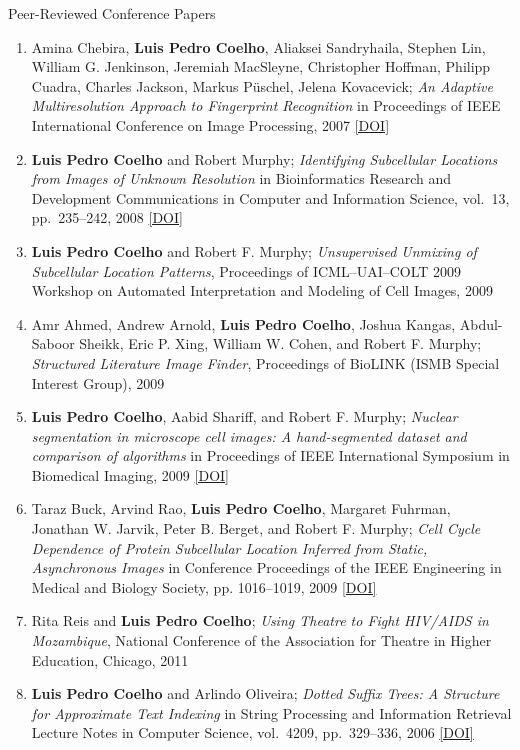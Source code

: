 \documentclass{article}
\renewcommand\subsection[1]{%
    \par\vspace{.1em}\penalty-100%
    {\hspace{1em}\subsubhead #1}%
    \par\vspace{.2em}\penalty100%
}
\newcommand\showdoi[1]{%
    \href{http://dx.doi.org/#1}{[DOI]}%
}
\begin{document}
\subsection{Peer-Reviewed Conference Papers}
\begin{enumerate}
\item Amina Chebira, \textbf{Luis Pedro Coelho}, Aliaksei Sandryhaila, Stephen
Lin, William G. Jenkinson, Jeremiah MacSleyne, Christopher Hoffman, Philipp
Cuadra, Charles Jackson, Markus Püschel, Jelena Kovacevick; \emph{An Adaptive
Multiresolution Approach to Fingerprint Recognition} in Proceedings of IEEE
International Conference on Image Processing, 2007
\showdoi{10.1109/ICIP.2007.4378990}

\item \textbf{Luis Pedro Coelho} and Robert Murphy; \emph{Identifying
Subcellular Locations from Images of Unknown Resolution} in Bioinformatics
Research and Development Communications in Computer and Information Science,
vol.\ 13, pp.\ 235--242, 2008 \showdoi{10.1007/978-3-540-70600-7_18}

\item \textbf{Luis Pedro Coelho} and Robert F. Murphy; \emph{Unsupervised
Unmixing of Subcellular Location Patterns}, Proceedings of ICML--UAI--COLT 2009
Workshop on Automated Interpretation and Modeling of Cell Images, 2009

\item Amr Ahmed, Andrew Arnold, \textbf{Luis Pedro Coelho}, Joshua Kangas,
Abdul-Saboor Sheikk, Eric P. Xing, William W. Cohen, and Robert F. Murphy;
\emph{Structured Literature Image Finder}, Proceedings of BioLINK (ISMB Special
Interest Group), 2009

\item \textbf{Luis Pedro Coelho}, Aabid Shariff, and Robert F. Murphy;
\emph{Nuclear segmentation in microscope cell images: A hand-segmented dataset
and comparison of algorithms} in Proceedings of IEEE International Symposium in
Biomedical Imaging, 2009 \showdoi{10.1109/ISBI.2009.5193098}

\item Taraz Buck, Arvind Rao, \textbf{Luis Pedro Coelho}, Margaret Fuhrman,
Jonathan W. Jarvik, Peter B. Berget, and Robert F. Murphy; \emph{Cell Cycle
Dependence of Protein Subcellular Location Inferred from Static, Asynchronous
Images} in Conference Proceedings of the IEEE Engineering in Medical and
Biology Society, pp. 1016--1019, 2009 \showdoi{10.1109/IEMBS.2009.5332888}

\item Rita Reis and \textbf{Luis Pedro Coelho}; \emph{Using Theatre to Fight
HIV/AIDS in Mozambique}, National Conference of the Association for Theatre in
Higher Education, Chicago, 2011

\item \textbf{Luis Pedro Coelho} and Arlindo Oliveira; \emph{Dotted Suffix
Trees: A Structure for Approximate Text Indexing} in String Processing and
Information Retrieval Lecture Notes in Computer Science, vol.\ 4209, pp.\
329--336, 2006 \showdoi{10.1007/11880561_27}
\end{enumerate}
\end{document}
